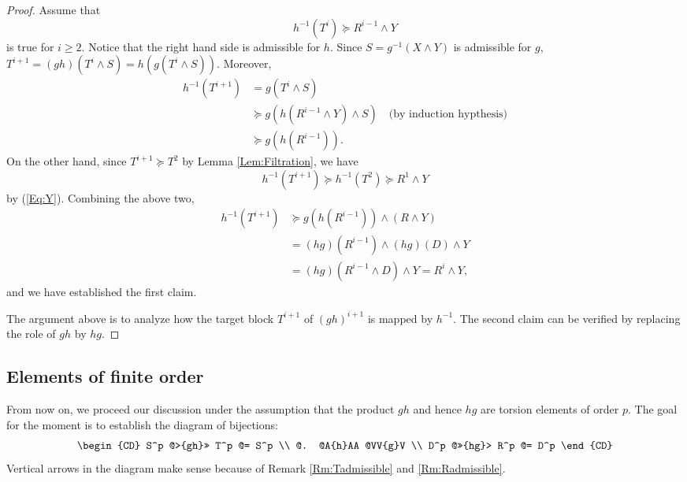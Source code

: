 \documentclass[12pt,reqno]{amsart}
\theoremstyle{plain}
\theoremstyle{definition}
\theoremstyle{remark}
\numberwithin{equation}{section}
\begin{document}
\begin{proof}
        Assume that 
        \begin{equation*} 
		h^{-1}(T^{i}) \succeq R^{i-1} \wedge Y
	\end{equation*} 
	is true for  $i \geq 2$.  
	Notice that the right hand side is admissible for  $h$.  
	Since  $S = g^{-1}(X \wedge Y)$  is admissible for  $g$,  
	$T^{i+1} = (gh)(T^{i} \wedge S) = h(g(T^{i} \wedge S))$.   
	Moreover, 
	\begin{align*} 
	        h^{-1}(T^{i+1}) & = g(T^{i}  \wedge S) \\ 
			& \succeq g(h(R^{i-1} \wedge Y) \wedge S)  \quad \text{(by induction hypthesis)} \\ 
			&  \succeq g(h(R^{i-1})).  
	\end{align*} 
	On the other hand, 
	since  $T^{i+1} \succeq T^2$  by Lemma \ref{Lem:Filtration},  
	we have 
	\begin{equation*}
               h^{-1}(T^{i+1})  \succeq  h^{-1}(T^2)  \succeq R^1 \wedge Y
         \end{equation*}
         by (\ref{Eq:Y}).  
	Combining the above two, 
         	\begin{align*} 
	        h^{-1}(T^{i+1}) &  \succeq g(h(R^{i-1})) \wedge (R \wedge Y)  \\
	                         & =  (hg)(R^{i-1}) \wedge (hg)(D) \wedge Y \\
	                         & = (hg)(R^{i-1} \wedge D) \wedge Y = R^i \wedge Y,  
	         \end{align*} 
         and we have established the first claim. 
         
         The argument above is to analyze how the target block  $T^{i+1}$  of  $(gh)^{i+1}$  
         is mapped by  $h^{-1}$.  
         The second claim can be verified by replacing the role of  $gh$  by  $hg$.  
\end{proof} 


\subsection{Elements of finite order}

From now on, 
we proceed our discussion under the assumption 
that the product  $gh$  and hence  $hg$  are torsion elements of order  $p$.  
The goal for the moment is to establish the diagram of bijections: 
\begin{equation*} 
	\begin{CD} 
		S^p @>{gh}>> T^p @= S^p \\ 
		@. @A{h}AA  @VV{g}V \\
		D^p @>>{hg}> R^p @= D^p 
	\end{CD}  
\end{equation*} 
Vertical arrows in the diagram make sense because of 
Remark \ref{Rm:Tadmissible} and \ref{Rm:Radmissible}.  
\end{document}
